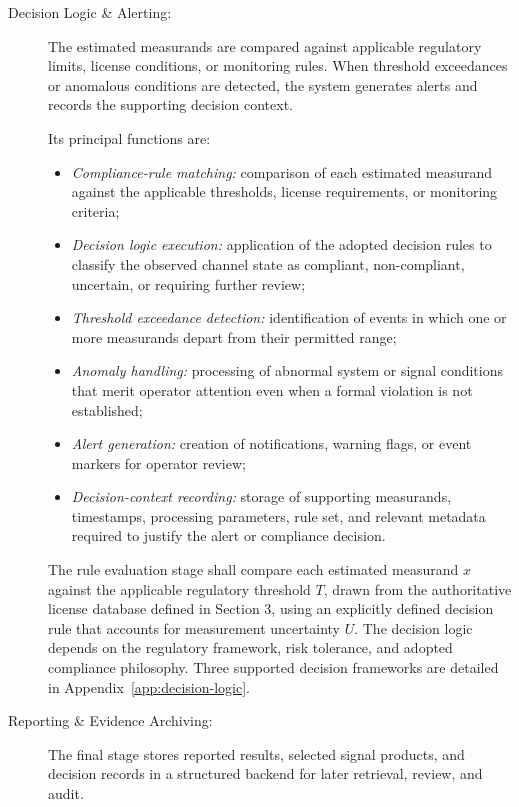 \documentclass[11pt]{report}
\begin{document}
\begin{description}
	\item[Decision Logic \& Alerting:]
	The estimated measurands are compared against applicable regulatory limits, license conditions, or monitoring rules. When threshold exceedances or anomalous conditions are detected, the system generates alerts and records the supporting decision context.
	
	Its principal functions are:
	\begin{itemize}
		\item \textit{Compliance-rule matching:} comparison of each estimated measurand against the applicable thresholds, license requirements, or monitoring criteria;
		
		\item \textit{Decision logic execution:} application of the adopted decision rules to classify the observed channel state as compliant, non-compliant, uncertain, or requiring further review;
		
		\item \textit{Threshold exceedance detection:} identification of events in which one or more measurands depart from their permitted range;
		
		\item \textit{Anomaly handling:} processing of abnormal system or signal conditions that merit operator attention even when a formal violation is not established;
		
		\item \textit{Alert generation:} creation of notifications, warning flags, or event markers for operator review;
		
		\item \textit{Decision-context recording:} storage of supporting measurands, timestamps, processing parameters, rule set, and relevant metadata required to justify the alert or compliance decision.
	\end{itemize}
	
	The rule evaluation stage shall compare each estimated measurand $x$ against the applicable regulatory threshold $T$, drawn from the authoritative license database defined in Section 3, using an explicitly defined decision rule that accounts for measurement uncertainty $U$. The decision logic depends on the regulatory framework, risk tolerance, and adopted compliance philosophy. Three supported decision frameworks are detailed in Appendix~\ref{app:decision-logic}.
	
	\item[Reporting \& Evidence Archiving:]
	The final stage stores reported results, selected signal products, and decision records in a structured backend for later retrieval, review, and audit.
	

\end{description}
\end{document}
